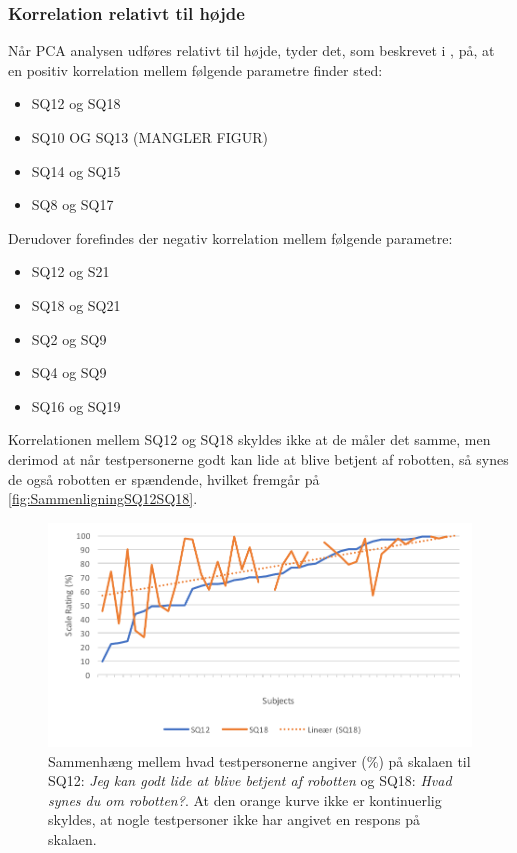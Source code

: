 \subsubsection{Korrelation relativt til højde}
Når PCA analysen udføres relativt til højde, tyder det, som beskrevet i , på, at en positiv korrelation mellem følgende parametre finder sted:
\begin{itemize}
	\item SQ12 og SQ18
	\item SQ10 OG SQ13 (MANGLER FIGUR)
	\item SQ14 og SQ15
	\item SQ8 og SQ17\blankline
\end{itemize}
\noindent
%
Derudover forefindes der negativ korrelation mellem følgende parametre:
\begin{itemize}
	\item SQ12 og S21
	\item SQ18 og SQ21
	\item SQ2 og SQ9
	\item SQ4 og SQ9
	\item SQ16 og SQ19\blankline
\end{itemize}
\noindent
%
Korrelationen mellem SQ12 og SQ18 skyldes ikke at de måler det samme, men derimod at når testpersonerne godt kan lide at blive betjent af robotten, så synes de også robotten er spændende, hvilket fremgår på \autoref{fig:SammenligningSQ12SQ18}. 
%
\begin{figure}[H]
	\centering
	\includegraphics[width=\textwidth]{Figure/Korrelationsgrafer/SQ12+SQ18}
	\caption{Sammenhæng mellem hvad testpersonerne angiver (\%) på skalaen til SQ12: \textit{Jeg kan godt lide at blive betjent af robotten} og SQ18: \textit{Hvad synes du om robotten?}. At den orange kurve ikke er kontinuerlig skyldes, at nogle testpersoner ikke har angivet en respons på skalaen.}
	\label{fig:SammenligningSQ12SQ18}
\end{figure}
